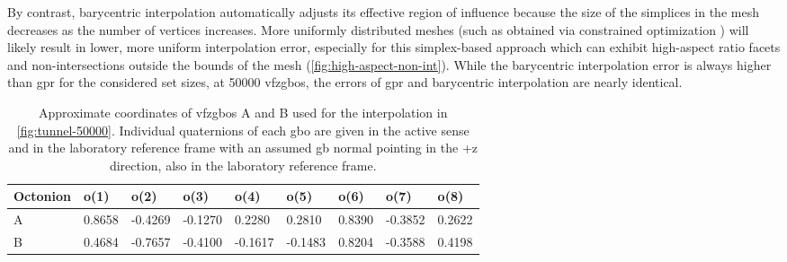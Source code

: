 \documentclass[final,twocolumn,12pt]{elsarticle}
\begin{document}
By contrast, barycentric interpolation automatically adjusts its effective region of influence because the size of the simplices in the mesh decreases as the number of vertices increases. More uniformly distributed meshes (such as obtained via constrained optimization \cite{dolanBenchmarkingOptimizationSoftware2004,ConstrainedElectrostaticNonlinear2020}) will likely result in lower, more uniform interpolation error, especially for this simplex-based approach which can exhibit high-aspect ratio facets and non-intersections outside the bounds of the mesh (\cref{fig:high-aspect-non-int}). While the barycentric interpolation error is always higher than \gls{gpr} for the considered set sizes, at \num{50000} \glspl{vfzgbo}, the errors of \gls{gpr} and barycentric interpolation are nearly identical.
\begin{table}[]
\centering
\caption{Approximate coordinates of \glspl{vfzgbo} A and B used for the interpolation in \cref{fig:tunnel-50000}. Individual quaternions of each \gls{gbo} are given in the active sense and in the laboratory reference frame with an assumed \gls{gb} normal pointing in the +z direction, also in the laboratory reference frame.}
\label{tab:tunnel-AB}
\begin{tabular}{@{}lllllllll@{}}
\toprule
Octonion & o(1)   & o(2)    & o(3)    & o(4)    & o(5)    & o(6)   & o(7)    & o(8)   \\ \midrule
A        & 0.8658 & -0.4269 & -0.1270 & 0.2280  & 0.2810  & 0.8390 & -0.3852 & 0.2622 \\
B        & 0.4684 & -0.7657 & -0.4100 & -0.1617 & -0.1483 & 0.8204 & -0.3588 & 0.4198 \\ \bottomrule
\end{tabular}
\end{table}
\end{document}
